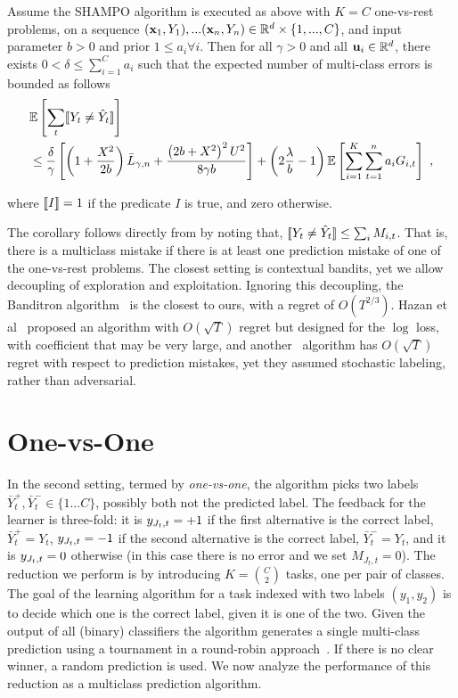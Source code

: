 \begin{corollary}
Assume the SHAMPO algorithm is executed as above with $K=C$ one-vs-rest problems, on a sequence 
$(\mathbf{x}_1,Y_1),...(\mathbf{x}_n,Y_n)\in\mathbb{R}^d\times\{1,...,C\}$, and input parameter $b>0$  and prior 
$1\le a_i\forall i$. Then for all $\gamma>0$ and all $\mathbf{u}_{i}\in\mathbb{R}^d$, there 
exists $0<\delta\le \sum_{i=1}^Ca_{i}$ such that the expected number of multi-class errors is bounded as follows
 \[
 \begin{split}
 &\mathbb{E}\left[{\sum_t [\![{Y_t \neq \hat{Y}_t}]\!]}\right]\\
 &\le \frac{\delta}{\gamma}\left[{\left(1+\frac{X^2}{2b} \right){\bar L}_{\gamma,n}+
 \frac{\left({2b+X^2}\right)^2U^2}{8{\gamma}b}}\right]
 +\left({2\frac{\lambda}{b}-1}\right)\mathbb{E}\left[{\sum_{i=1}^{K}\sum_{t=1}^{n}{a_{i}G_{i,t}}}\right]~,
 \end{split}
 \]


where $[\![{I}]\!]=1$ if the predicate $I$ is true, and zero otherwise.
\end{corollary}
The corollary follows directly from  by noting that, 
$[\![{Y_t \neq \hat{Y}_t}]\!] \leq \sum_i M_{i,t}$. That is, there is a multiclass mistake if there is at least one 
prediction mistake of one of the one-vs-rest problems. The closest setting is contextual bandits, yet we 
allow decoupling of exploration and exploitation. Ignoring this decoupling, the 
Banditron algorithm~\cite{kakade2008efficient} is the closest to ours, 
with a regret of $O(T^{2/3})$. Hazan et al~\cite{hazan2011newtron} proposed an algorithm 
with $O(\sqrt{T})$ regret but designed for the $\log$ loss, with coefficient that may be very large, and 
another~\cite{DBLP:journals/ml/CrammerG13} algorithm has $O(\sqrt{T})$ regret with respect to prediction 
mistakes, yet they assumed stochastic labeling, rather than adversarial.


\section{One-vs-One}
In the second setting, termed by {\em one-vs-one}, the algorithm picks two labels 
$\bar{Y}^+_t,\bar{Y}^-_t \in\{1\dots C\}$, possibly both not the predicted label. 
The feedback for the learner is three-fold: it is $y_{J_t,t}=+1$ if the first alternative is the correct label, 
$\bar{Y}^+_t=Y_t$, $y_{J_t,t}=-1$ if the second alternative is the correct label, $\bar{Y}^-_t=Y_t$, 
and it is $y_{J_t,t}=0$ otherwise (in this case there is no error and we set $M_{J_t,t}=0$). 
The reduction we perform is by introducing $K= {C \choose 2}$ tasks, one per pair of classes.  
The goal of the learning algorithm for a task indexed with two labels $(y_1,y_2)$ is to decide 
which one is the correct label, given it is one of the two. Given the output of all (binary) classifiers the 
algorithm generates a single multi-class prediction using a tournament in a round-robin 
approach~\cite{DBLP:journals/jmlr/Furnkranz02}. If there is no clear winner, a random prediction is used. 
We now analyze the performance of this reduction as a multiclass prediction algorithm.

